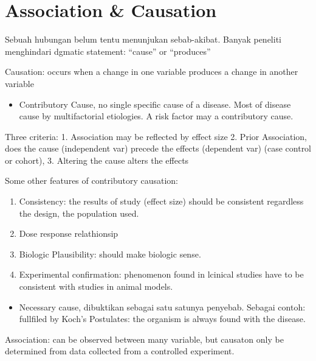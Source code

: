 \documentclass[
  letterpaper,
  DIV=11,
  numbers=noendperiod]{scrreprt}
\providecommand{\tightlist}{%
  \setlength{\itemsep}{0pt}\setlength{\parskip}{0pt}}\usepackage{longtable,booktabs,array}
\begin{document}
\section{Association \& Causation}\label{association-causation}

Sebuah hubungan belum tentu menunjukan sebab-akibat. Banyak peneliti
menghindari dgmatic statement: ``cause'' or ``produces''

Causation: occurs when a change in one variable produces a change in
another variable

\begin{itemize}
\tightlist
\item
  Contributory Cause, no single specific cause of a disease. Most of
  disease cause by multifactorial etiologies. A risk factor may a
  contributory cause.
\end{itemize}

Three criteria: 1. Association may be reflected by effect size 2. Prior
Association, does the cause (independent var) precede the effects
(dependent var) (case control or cohort), 3. Altering the cause alters
the effects

Some other features of contributory causation:

\begin{enumerate}
\def\labelenumi{\arabic{enumi}.}
\item
  Consistency: the results of study (effect size) should be consistent
  regardless the design, the population used.
\item
  Dose response relathionsip
\item
  Biologic Plausibility: should make biologic sense.
\item
  Experimental confirmation: phenomenon found in lcinical studies have
  to be consistent with studies in animal models.
\end{enumerate}

\begin{itemize}
\tightlist
\item
  Necessary cause, dibuktikan sebagai satu satunya penyebab. Sebagai
  contoh: fullfiled by Koch's Postulates: the organism is always found
  with the disease.
\end{itemize}

Association: can be observed between many variable, but causaton only be
determined from data collected from a controlled experiment.
\end{document}
